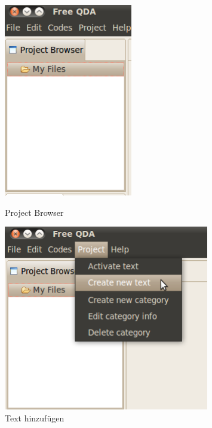 \begin{figure}[!hbt]
\begin{minipage}[!hb!]{0.5\textwidth}
	\centering
	 \includegraphics[width=0.5\textwidth]{img/ProjectBrowser}
	\caption{Project Browser}
	\label{fig:projectbrowser}
\end{minipage}
\hfill
\begin{minipage}[!hb!]{0.5\textwidth}
	\centering
	 \includegraphics[width=0.8\textwidth]{img/CreateNewText}
	\caption{Text hinzufügen}
	\label{fig:texthinzu}
\end{minipage}
\end{figure}

